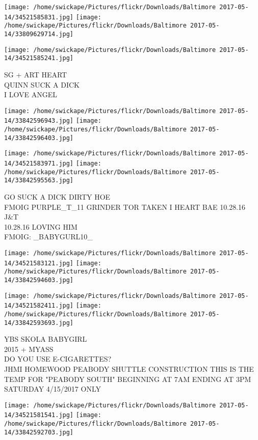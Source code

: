 \documentclass[10pt,letterpaper]{article}
\begin{document}
\texttt{[image: /home/swickape/Pictures/flickr/Downloads/Baltimore 2017-05-14/34521585831.jpg]}
\texttt{[image: /home/swickape/Pictures/flickr/Downloads/Baltimore 2017-05-14/33809629714.jpg]}

\vspace{0.25in}
\texttt{[image: /home/swickape/Pictures/flickr/Downloads/Baltimore 2017-05-14/34521585241.jpg]}

SG + ART HEART\\
QUINN SUCK A DICK\\
I LOVE ANGEL
\pagebreak

\texttt{[image: /home/swickape/Pictures/flickr/Downloads/Baltimore 2017-05-14/33842596943.jpg]}
\texttt{[image: /home/swickape/Pictures/flickr/Downloads/Baltimore 2017-05-14/33842596403.jpg]}

\texttt{[image: /home/swickape/Pictures/flickr/Downloads/Baltimore 2017-05-14/34521583971.jpg]}
\texttt{[image: /home/swickape/Pictures/flickr/Downloads/Baltimore 2017-05-14/33842595563.jpg]}

GO SUCK A DICK DIRTY HOE\\
FMOIG PURPLE\_T\_11 GRINDER TOR TAKEN I HEART BAE  10.28.16 J\&T\\
10.28.16 LOVING HIM\\
FMOIG: \_BABYGURL10\_
\pagebreak

\texttt{[image: /home/swickape/Pictures/flickr/Downloads/Baltimore 2017-05-14/34521583121.jpg]}
\texttt{[image: /home/swickape/Pictures/flickr/Downloads/Baltimore 2017-05-14/33842594603.jpg]}

\texttt{[image: /home/swickape/Pictures/flickr/Downloads/Baltimore 2017-05-14/34521582411.jpg]}
\texttt{[image: /home/swickape/Pictures/flickr/Downloads/Baltimore 2017-05-14/33842593693.jpg]}

YBS SKOLA BABYGIRL\\
2015 + MYASS\\
DO YOU USE E{-}CIGARETTES?\\
JHMI HOMEWOOD PEABODY SHUTTLE CONSTRUCTION THIS IS THE TEMP FOR "PEABODY SOUTH" BEGINNING AT 7AM ENDING AT 3PM SATURDAY 4/15/2017 ONLY
\pagebreak

\texttt{[image: /home/swickape/Pictures/flickr/Downloads/Baltimore 2017-05-14/34521581541.jpg]}
\texttt{[image: /home/swickape/Pictures/flickr/Downloads/Baltimore 2017-05-14/33842592703.jpg]}
\end{document}
